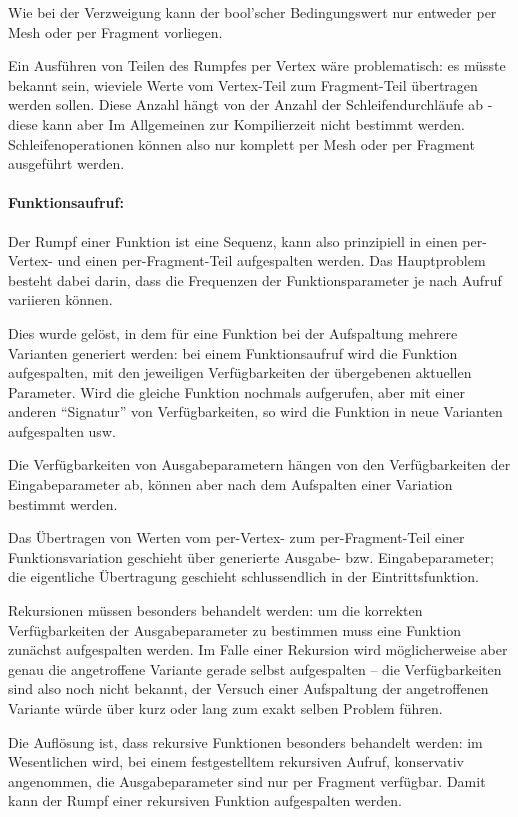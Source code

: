 \documentclass[twoside,a4paper,fleqn,12pt]{article}
\begin{document}
Wie bei der Verzweigung kann der bool'scher Bedingungswert nur entweder per Mesh oder per Fragment vorliegen.

Ein Ausführen von Teilen des Rumpfes per Vertex wäre problematisch: es müsste bekannt sein, wieviele Werte vom Vertex-Teil
zum Fragment-Teil übertragen werden sollen. Diese Anzahl hängt von der Anzahl der Schleifendurchläufe ab -
diese kann aber Im Allgemeinen zur Kompilierzeit nicht bestimmt werden. Schleifenoperationen können also nur komplett
per Mesh oder per Fragment ausgeführt werden.

\paragraph{Funktionsaufruf:} Der Rumpf einer Funktion ist eine Sequenz, kann also prinzipiell in einen per-Vertex- und einen per-Fragment-Teil aufgespalten werden.
Das Hauptproblem besteht dabei darin, dass die Frequenzen der Funktionsparameter je nach Aufruf variieren können.

Dies wurde gelöst, in dem für eine Funktion bei der Aufspaltung mehrere Varianten generiert werden: bei einem Funktionsaufruf
wird die Funktion aufgespalten, mit den jeweiligen Verfügbarkeiten der übergebenen aktuellen Parameter. Wird die gleiche Funktion
nochmals aufgerufen, aber mit einer anderen "`Signatur"' von Verfügbarkeiten, so wird die Funktion in neue Varianten aufgespalten usw.

Die Verfügbarkeiten von Ausgabeparametern hängen von den Verfügbarkeiten der Eingabeparameter ab, können aber nach dem Aufspalten
einer Variation bestimmt werden.

Das Übertragen von Werten vom per-Vertex- zum per-Fragment-Teil einer Funktionsvariation geschieht über generierte Ausgabe- bzw.
Eingabeparameter; die eigentliche Übertragung geschieht schlussendlich in der Eintrittsfunktion.

Rekursionen müssen besonders behandelt werden: um die korrekten Verfügbarkeiten der Ausgabeparameter zu bestimmen
muss eine Funktion zunächst aufgespalten werden. Im Falle einer Rekursion wird möglicherweise aber genau die angetroffene
Variante gerade selbst aufgespalten -- die Verfügbarkeiten sind also noch nicht bekannt, der Versuch einer Aufspaltung der
angetroffenen Variante würde über kurz oder lang zum exakt selben Problem führen.

Die Auflösung ist, dass rekursive Funktionen besonders behandelt werden: im Wesentlichen wird, bei einem festgestelltem
rekursiven Aufruf, konservativ angenommen, die Ausgabeparameter sind nur per Fragment verfügbar. Damit kann der Rumpf
einer rekursiven Funktion aufgespalten werden.
\end{document}
